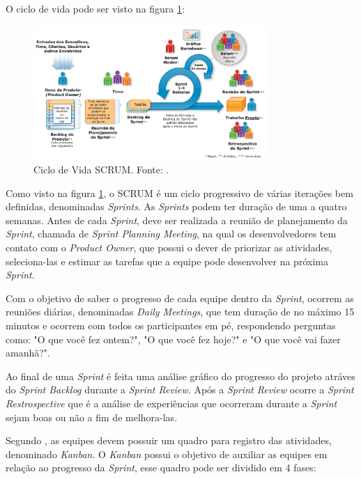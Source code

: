 O ciclo de vida pode ser visto na figura \ref{img:ciclo_de_vida_scrum}:

\begin{figure}[H]
	\centering
	\includegraphics[width=0.8\textwidth]{figuras/ciclo_de_vida_scrum.png}
	\caption{Ciclo de Vida SCRUM. Fonte: \cite{scrum}.}
	\label{img:ciclo_de_vida_scrum}
\end{figure}

Como visto na figura \ref{img:ciclo_de_vida_scrum}, o SCRUM é um ciclo progressivo de várias iterações bem definidas, denominadas \textit{Sprints}. As \textit{Sprints} podem ter duração de uma a quatro semanas. Antes de cada \textit{Sprint}, deve ser realizada a reunião de planejamento da \textit{Sprint}, chamada de \textit{Sprint Planning Meeting}, na qual os desenvolvedores tem contato com o \textit{Product Owner}, que possui o dever de priorizar as atividades, seleciona-las e estimar as tarefas que a equipe pode desenvolver na próxima \textit{Sprint}.

Com o objetivo de saber o progresso de cada equipe dentro da \textit{Sprint}, ocorrem as reuniões diárias, denominadas \textit{Daily Meetings}, que tem duração de no máximo 15 minutos e ocorrem com todos os participantes em pé, respondendo perguntas como: "O que você fez ontem?", "O que você fez hoje?" e "O que você vai fazer amanhã?". 

Ao final de uma \textit{Sprint} é feita uma análise gráfico do progresso do projeto atráves do \textit{Sprint Backlog} durante a \textit{Sprint Review}. Após a \textit{Sprint Review} ocorre a \textit{Sprint Restrospective} que é a análise de experiências que ocorreram durante a \textit{Sprint} sejam boas ou não a fim de melhora-las.

Segundo \cite{fowler}, as equipes devem possuir um quadro para registro das atividades, denominado \textit{Kanban}. O \textit{Kanban} possui o objetivo de auxiliar as equipes em relação ao progresso da \textit{Sprint}, esse quadro pode ser dividido em 4 fases:

